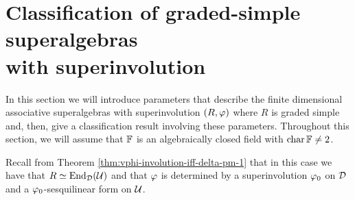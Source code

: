 







\section{Classification of graded-simple superalgebras\\ with superinvolution}

In this section we will introduce parameters that describe the finite dimensional associative superalgebras with superinvolution $(R, \varphi)$ where $R$ is graded simple and, then, give a classification result involving these parameters. 
Throughout this section, we will assume that $\mathbb{F}$ is an algebraically closed field with $\operatorname{char} \mathbb{F} \neq 2$.

Recall from Theorem \ref{thm:vphi-involution-iff-delta-pm-1} that in this case we have that $R \simeq \operatorname{End}_{\mathcal{D}} (\mathcal U)$ and that $\varphi$ is determined by a superinvolution $\varphi_0$ on $\mathcal{D}$ and a $\varphi_0$-sesquilinear form on $\mathcal U$.

